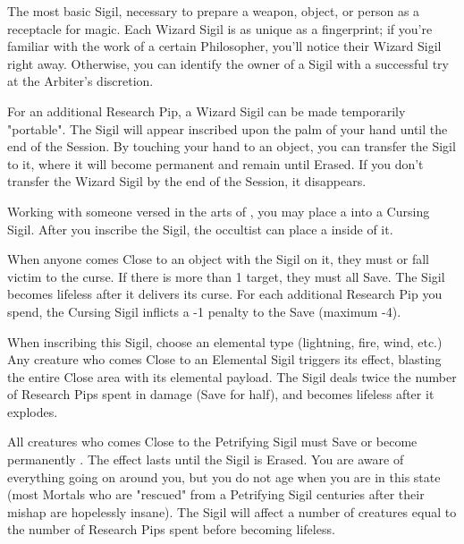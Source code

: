 The most basic Sigil, necessary to prepare a weapon, object, or person as a receptacle for magic. Each Wizard Sigil is as unique as a fingerprint; if you're familiar with the work of a certain Philosopher, you'll notice their Wizard Sigil right away.  Otherwise, you can identify the owner of a Sigil with a successful  try at the Arbiter's discretion.

For an additional Research Pip, a Wizard Sigil can be made temporarily "portable". The Sigil will appear inscribed upon the palm of your hand until the end of the Session. By touching your hand to an object, you can transfer the Sigil to it, where it will become permanent and remain until Erased. If you don't transfer the Wizard Sigil by the end of the Session, it disappears.






Working with someone versed in the arts of , you may place a  into a Cursing Sigil. After you inscribe the Sigil, the occultist can place a  inside of it. 

When anyone comes Close to an object with the Sigil on it, they must  or fall victim to the curse. If there is more than 1 target, they must all Save.  The Sigil becomes lifeless after it delivers its curse.  For each additional Research Pip you spend, the Cursing Sigil inflicts a -1 penalty to the Save (maximum -4).



When inscribing this Sigil, choose an elemental type (lightning, fire, wind, etc.) Any creature who comes Close to an Elemental Sigil triggers its effect, blasting the entire Close area with its elemental payload. The Sigil deals twice the number of Research Pips spent in damage (Save for half), and becomes lifeless after it explodes.


All creatures who comes Close to the Petrifying Sigil must Save or become permanently . The effect lasts until the Sigil is Erased. You are aware of everything going on around you, but you do not age when you are in this state (most Mortals who are "rescued" from a Petrifying Sigil centuries after their mishap are hopelessly insane). The Sigil will affect a number of creatures equal to the number of Research Pips spent before becoming lifeless.

